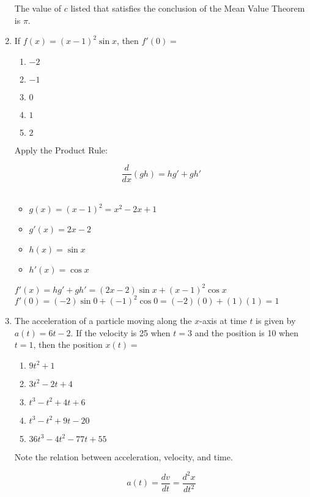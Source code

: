 \documentclass[10pt, letterpaper]{report}
\begin{document}
\begin{enumerate}
    The value of $c$ listed that satisfies the conclusion of the Mean Value Theorem is $\pi$. \\

    \hline
  \item{If $f(x)=(x-1)^{2}\sin{x}$, then $f'(0)=$}
    \begin{enumerate}
      \item{$-2$}
      \item{$-1$}
      \item{$0$}
      \item{$1$}
      \item{$2$} \\
    \end{enumerate}

    Apply the Product Rule:

    $$ \frac{d}{dx}(gh)=hg'+gh' $$ \\

    \begin{itemize}
      \item{$g(x)=(x-1)^{2}=x^{2}-2x+1$}
      \item{$g'(x)=2x-2$}
      \item{$h(x)=\sin{x}$}
      \item{$h'(x)=\cos{x}$}
    \end{itemize}

    $f'(x)=hg'+gh'=(2x-2)\sin{x}+(x-1)^{2}\cos{x}$ \\

    $f'(0)=(-2)\sin{0}+(-1)^{2}\cos{0}=(-2)(0)+(1)(1)=1$

  \pagebreak
  \item{The acceleration of a particle moving along the $x$-axis at time $t$ is given by $a(t)=6t-2$. If the velocity is 25 when $t=3$ and the position is 10 when $t=1$, then the position $x(t)=$}
    \begin{enumerate}
      \item{$9t^{2}+1$}
      \item{$3t^{2}-2t+4$}
      \item{$t^{3}-t^{2}+4t+6$}
      \item{$t^{3}-t^{2}+9t-20$}
      \item{$36t^{3}-4t^{2}-77t+55$} \\
    \end{enumerate}

    Note the relation between acceleration, velocity, and time.

    $$ a(t)=\frac{dv}{dt}=\frac{d^{2}x}{dt^{2}} $$ \\


\end{enumerate}
\end{document}
